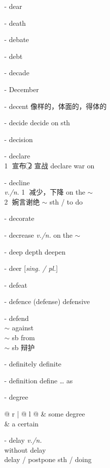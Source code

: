 \documentclass[../../book.tex]{subfiles}
\begin{document}
\begin{multicols}{2}
\begin{itemize}
\\\textcircled{2} 协议，交易 sign a deal with sb
\\\textcircled{3} It\textquoteright s not a big deal.
\\\textcircled{4} It\textquoteright s a deal. 就这么办吧
\item[-] dear
\item[-] death
\item[-] debate
\item[-] debt
\item[-] decade
\item[-] December
\item[-] decent 像样的，体面的，得体的
\item[-] decide \phantom{a} decide on sth
\item[-] decision
\item[-] declare
\\\textcircled{1} 宣布 \textcircled{2} 宣战 declare war on
\item[-] decline
\\\emph{v./n.} \textcircled{1} 减少，下降 on the $\sim$
\\\textcircled{2} 婉言谢绝 $\sim$ sth / to do
\item[-] decorate
\item[-] decrease \emph{v./n.} on the $\sim$
\item[-] deep \phantom{a} depth deepen
\item[-] deer [\emph{sing. / pl.}]
\item[-] defeat
\item[-] defence (defense) \phantom{a} defensive
\item[-] defend
\\$\sim$ against
\\$\sim$ sb from
\\$\sim$ sb 辩护
\item[-] definitely \phantom{a} definite
\item[-] definition \phantom{a} define \ldots{} as
\item[-] degree
\\\begin{tabular}{@{} r | @{\hspace{0.1em}} l @{}}
 & some \phantom{a} degree
\\& a certain
\end{tabular}
\item[-] delay \emph{v./n.}
\\without delay
\\delay / postpone sth / doing

\end{itemize}
\end{multicols}
\end{document}
